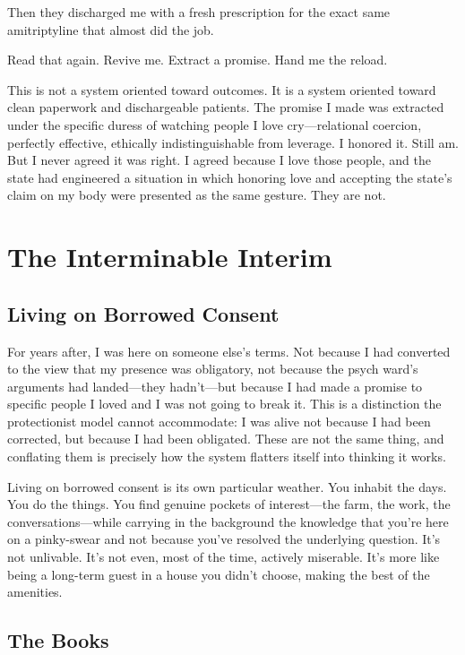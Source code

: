 \documentclass[10pt, letterpaper, twocolumn]{article}
\begin{document}
Then they discharged me with a fresh prescription for the exact same amitriptyline that almost did the job.

Read that again. Revive me. Extract a promise. Hand me the reload.

This is not a system oriented toward outcomes. It is a system oriented toward clean paperwork and dischargeable patients. The promise I made was extracted under the specific duress of watching people I love cry---relational coercion, perfectly effective, ethically indistinguishable from leverage. I honored it. Still am. But I never agreed it was right. I agreed because I love those people, and the state had engineered a situation in which honoring love and accepting the state's claim on my body were presented as the same gesture. They are not.

\section{The Interminable Interim}

\subsection{Living on Borrowed Consent}

For years after, I was here on someone else's terms. Not because I had converted to the view that my presence was obligatory, not because the psych ward's arguments had landed---they hadn't---but because I had made a promise to specific people I loved and I was not going to break it. This is a distinction the protectionist model cannot accommodate: I was alive not because I had been corrected, but because I had been obligated. These are not the same thing, and conflating them is precisely how the system flatters itself into thinking it works.

Living on borrowed consent is its own particular weather. You inhabit the days. You do the things. You find genuine pockets of interest---the farm, the work, the conversations---while carrying in the background the knowledge that you're here on a pinky-swear and not because you've resolved the underlying question. It's not unlivable. It's not even, most of the time, actively miserable. It's more like being a long-term guest in a house you didn't choose, making the best of the amenities.

\subsection{The Books}
\end{document}
